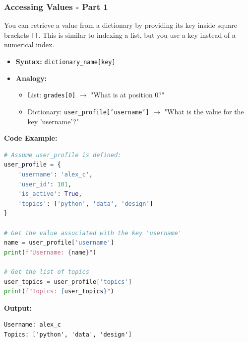\documentclass{beamer}
\begin{document}
\begin{frame}[fragile]
    \frametitle{Accessing Values - Part 1}

    You can retrieve a value from a dictionary by providing its key inside square brackets \texttt{[]}. This is similar to indexing a list, but you use a key instead of a numerical index.

    \begin{itemize}
        \item \textbf{Syntax:} \texttt{dictionary\_name[key]}
        \item \textbf{Analogy:}
        \begin{itemize}
            \item List: \texttt{grades[0]} $\rightarrow$ "What is at position 0?"
            \item Dictionary: \texttt{user\_profile['username']} $\rightarrow$ "What is the value for the key 'username'?"
        \end{itemize}
    \end{itemize}

    \textbf{Code Example:}
    \begin{lstlisting}[language=Python]
# Assume user_profile is defined:
user_profile = {
    'username': 'alex_c',
    'user_id': 101,
    'is_active': True,
    'topics': ['python', 'data', 'design']
}

# Get the value associated with the key 'username'
name = user_profile['username']
print(f"Username: {name}")

# Get the list of topics
user_topics = user_profile['topics']
print(f"Topics: {user_topics}")
    \end{lstlisting}
    \textbf{Output:}
    \begin{verbatim}
Username: alex_c
Topics: ['python', 'data', 'design']
    \end{verbatim}
\end{frame}
\end{document}
